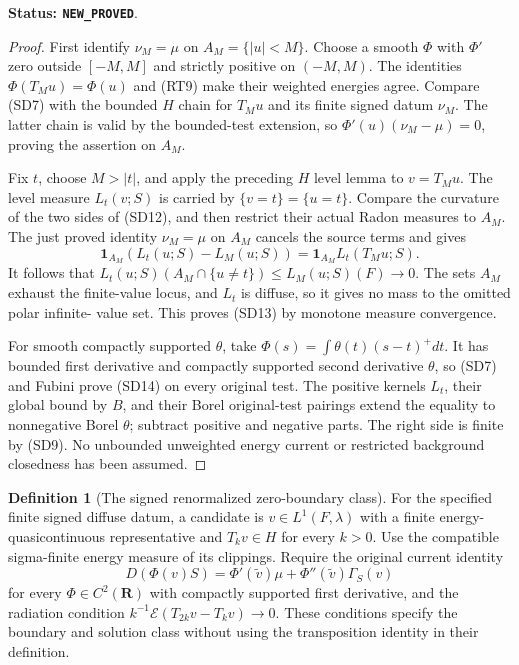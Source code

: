 \documentclass[11pt,a4paper]{article}
\numberwithin{equation}{section}
\theoremstyle{definition}
\newtheorem{definition}[theorem]{Definition}
\theoremstyle{remark}
\begin{document}
\noindent\textbf{Status: \texttt{NEW\_PROVED}}.

\begin{proof}
First identify $\nu_M=\mu$ on $A_M=\{|u|<M\}$.
Choose a smooth $\Phi$ with $\Phi'$ zero outside $[-M,M]$
and strictly positive on $(-M,M)$.
The identities $\Phi(T_Mu)=\Phi(u)$ and (RT9) make their
weighted energies agree.  Compare (SD7) with the bounded
$H$ chain for $T_Mu$ and its finite signed datum $\nu_M$.
The latter chain is valid by the bounded-test extension,
so $\Phi'(u)(\nu_M-\mu)=0$, proving the assertion on $A_M$.

Fix $t$, choose $M>|t|$, and apply the preceding $H$ level
lemma to $v=T_Mu$.  The level measure $L_t(v;S)$ is carried
by $\{v=t\}=\{u=t\}$.
Compare the curvature of the two sides of (SD12), and then
restrict their actual Radon measures to $A_M$.
The just proved identity $\nu_M=\mu$ on $A_M$ cancels the
source terms and gives
\[
     \mathbf1_{A_M}(L_t(u;S)-L_M(u;S))
                         =\mathbf1_{A_M}L_t(T_Mu;S).
\]
It follows that
$L_t(u;S)(A_M\cap\{u\ne t\})\le L_M(u;S)(F)\to0$.
The sets $A_M$ exhaust the finite-value locus, and $L_t$ is
diffuse, so it gives no mass to the omitted polar infinite-
value set.  This proves (SD13) by monotone measure convergence.

For smooth compactly supported $\theta$, take
$\Phi(s)=\int\theta(t)(s-t)^+dt$.
It has bounded first derivative and compactly supported
second derivative $\theta$, so (SD7) and Fubini prove
(SD14) on every original test.
The positive kernels $L_t$, their global bound by $B$,
and their Borel original-test pairings extend the equality
to nonnegative Borel $\theta$; subtract positive and negative
parts.  The right side is finite by (SD9).
No unbounded unweighted energy current or restricted
background closedness has been assumed.
\end{proof}

\begin{definition}[The signed renormalized zero-boundary class]
\label{def:r11-signed-renormalized-boundary}
For the specified finite signed diffuse datum, a candidate is
$v\in L^1(F,\lambda)$ with a finite energy-quasicontinuous
representative and $T_kv\in H$ for every $k>0$.
Use the compatible sigma-finite energy measure of its
clippings.  Require the original current identity
\[
 D(\Phi(v)S)=\Phi'(\widetilde v)\mu
                     +\Phi''(\widetilde v)\Gamma_S(v)
 \tag{SD15}
\]
for every $\Phi\in C^2(\mathbf R)$ with compactly supported
first derivative, and the radiation condition
$k^{-1}\mathcal E(T_{2k}v-T_kv)\to0$.
These conditions specify the boundary and solution class
without using the transposition identity in their definition.
\end{definition}
\end{document}
